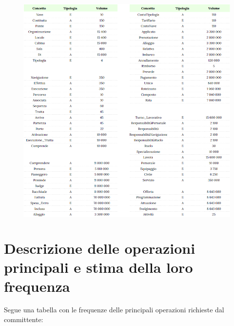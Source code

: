\documentclass[a4paper, titlepage]{report}
\begin{document}
	\begin{figure}[h]
		\centering
		\includegraphics[scale=1]{images/TabVolumi.png}		
	\end{figure}	
	

\newpage


\section*{Descrizione delle operazioni principali e stima della loro frequenza}

Segue una tabella con le frequenze delle principali operazioni richieste dal committente:
\end{document}
